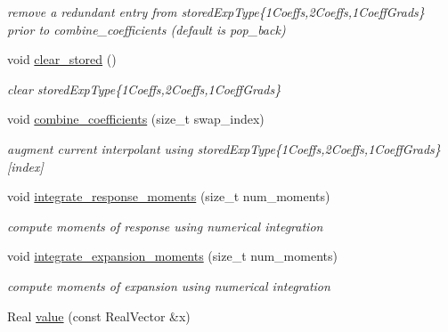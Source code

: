 \begin{DoxyCompactItemize}
\begin{DoxyCompactList}\small\item\em remove a redundant entry from stored\+Exp\+Type\{1\+Coeffs,2\+Coeffs,1\+Coeff\+Grads\} prior to combine\+\_\+coefficients (default is pop\+\_\+back) \end{DoxyCompactList}\item 
void \hyperlink{classPecos_1_1NodalInterpPolyApproximation_ae4337960917eda26a5672e5c6afbb62a}{clear\+\_\+stored} ()\label{classPecos_1_1NodalInterpPolyApproximation_ae4337960917eda26a5672e5c6afbb62a}

\begin{DoxyCompactList}\small\item\em clear stored\+Exp\+Type\{1\+Coeffs,2\+Coeffs,1\+Coeff\+Grads\} \end{DoxyCompactList}\item 
void \hyperlink{classPecos_1_1NodalInterpPolyApproximation_a7c794213befc83c9f90137f22e4cd39d}{combine\+\_\+coefficients} (size\+\_\+t swap\+\_\+index)\label{classPecos_1_1NodalInterpPolyApproximation_a7c794213befc83c9f90137f22e4cd39d}

\begin{DoxyCompactList}\small\item\em augment current interpolant using stored\+Exp\+Type\{1\+Coeffs,2\+Coeffs,1\+Coeff\+Grads\}\mbox{[}index\mbox{]} \end{DoxyCompactList}\item 
void \hyperlink{classPecos_1_1NodalInterpPolyApproximation_a9e2f6de3dafca8df624fef2a132b5185}{integrate\+\_\+response\+\_\+moments} (size\+\_\+t num\+\_\+moments)\label{classPecos_1_1NodalInterpPolyApproximation_a9e2f6de3dafca8df624fef2a132b5185}

\begin{DoxyCompactList}\small\item\em compute moments of response using numerical integration \end{DoxyCompactList}\item 
void \hyperlink{classPecos_1_1NodalInterpPolyApproximation_a611ac6de1665bc1197922b77823250c2}{integrate\+\_\+expansion\+\_\+moments} (size\+\_\+t num\+\_\+moments)\label{classPecos_1_1NodalInterpPolyApproximation_a611ac6de1665bc1197922b77823250c2}

\begin{DoxyCompactList}\small\item\em compute moments of expansion using numerical integration \end{DoxyCompactList}\item 
Real \hyperlink{classPecos_1_1NodalInterpPolyApproximation_a7bc9dcdf32fc46f97e286268c1ac51b0}{value} (const Real\+Vector \&x)\label{classPecos_1_1NodalInterpPolyApproximation_a7bc9dcdf32fc46f97e286268c1ac51b0}


\end{DoxyCompactItemize}

